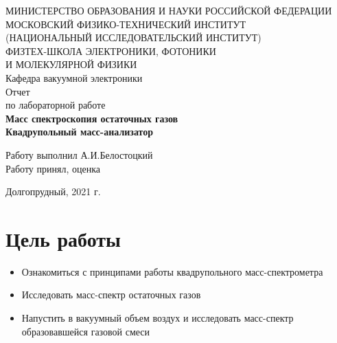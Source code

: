 \documentclass[a4paper,12pt]{article}
\begin{document}
 

\begin{titlepage}
	\begin{center}
		\large 	МИНИСТЕРСТВО ОБРАЗОВАНИЯ И НАУКИ РОССИЙСКОЙ ФЕДЕРАЦИИ\\
				МОСКОВСКИЙ ФИЗИКО-ТЕХНИЧЕСКИЙ ИНСТИТУТ \\
				(НАЦИОНАЛЬНЫЙ ИССЛЕДОВАТЕЛЬСКИЙ ИНСТИТУТ)\\ 
				ФИЗТЕХ-ШКОЛА ЭЛЕКТРОНИКИ, ФОТОНИКИ \\
				И МОЛЕКУЛЯРНОЙ ФИЗИКИ \\
		
		
		\vspace{4.0 cm}
		\LARGE{Кафедра вакуумной электроники \\ 
		Отчет \\
		по лабораторной работе} \\ 
		\LARGE \textbf{Масс спектроскопия остаточных газов} \\
		\LARGE \textbf{Квадрупольный масс-анализатор}
	\end{center}
	\vspace{3 cm} \large

	\begin{flushleft}
		Работу выполнил \hspace{5.5cm}  \underline{\hspace{3cm}} А.И.Белостоцкий \\	
		\vspace{1cm}
		Работу принял, оценка \hspace{4.3cm} \underline{\hspace{3cm}}
	\end{flushleft}
	

	
	\vfill

	\begin{center}
	Долгопрудный, 2021 г.
	\end{center}
\end{titlepage}                                                                      

\section*{Цель работы}
\begin{itemize}
\item Ознакомиться с принципами работы квадрупольного масс-спектрометра
\item Исследовать масс-спектр остаточных газов
\item Напустить в вакуумный объем воздух и исследовать масс-спектр образовавшейся газовой смеси
\end{itemize}
\end{document}
